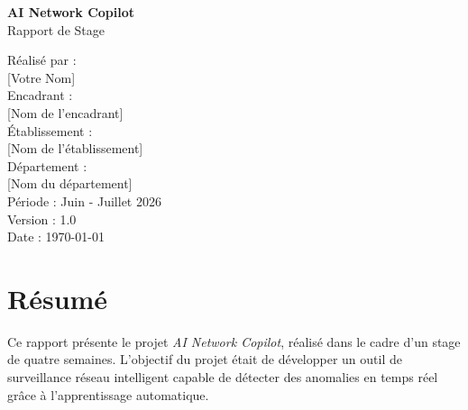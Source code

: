 \documentclass[12pt,a4paper]{report}
\begin{document}
\begin{titlepage}
    \centering
    \vspace*{2cm}

    {\LARGE \textbf{AI Network Copilot}}\\[1.5cm]

    {\Large Rapport de Stage}\\[0.5cm]

    \vspace{1cm}

    {\large Réalisé par :}\\
    {\large [Votre Nom]}\\[0.5cm]

    {\large Encadrant :}\\
    {\large [Nom de l'encadrant]}\\[0.5cm]

    {\large Établissement :}\\
    {\large [Nom de l'établissement]}\\[0.5cm]

    {\large Département :}\\
    {\large [Nom du département]}\\[2cm]

    {\large Période : Juin - Juillet 2026}\\[1cm]

    {\large Version : 1.0}\\[0.5cm]

    {\large Date : \today}\\[2cm]


    \vfill


\end{titlepage}

\chapter*{Résumé}
\thispagestyle{empty}

Ce rapport présente le projet \textit{AI Network Copilot}, réalisé dans le cadre d'un stage de quatre semaines. L'objectif du projet était de développer un outil de surveillance réseau intelligent capable de détecter des anomalies en temps réel grâce à l'apprentissage automatique.
\end{document}
